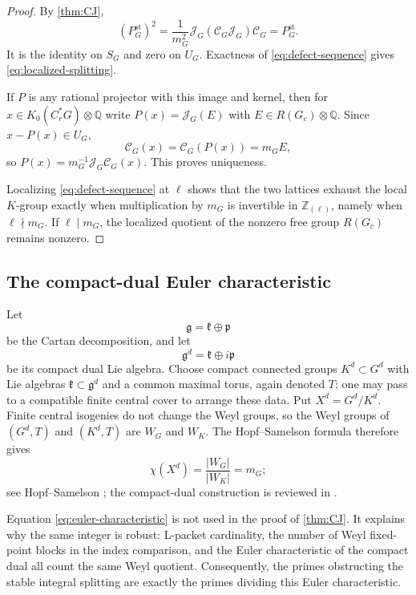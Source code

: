 \documentclass[11pt]{amsart}
\theoremstyle{definition}
\theoremstyle{remark}
\newcommand{\Z}{\mathbb Z}
\newcommand{\Q}{\mathbb Q}
\newcommand{\Cr}{C_r^*}
\newcommand{\st}{\mathrm{st}}
\begin{document}
\begin{proof}
By \cref{thm:CJ},
\[
  (P_G^{\st})^2
  =\frac1{m_G^2}\mathcal J_G
    (\mathcal C_G\mathcal J_G)\mathcal C_G
  =P_G^{\st}.
\]
It is the identity on $S_G$ and zero on $U_G$.  Exactness of \eqref{eq:defect-sequence} gives \eqref{eq:localized-splitting}.

If $P$ is any rational projector with this image and kernel, then for $x\in K_0(\Cr G)\otimes\Q$ write $P(x)=\mathcal J_G(E)$ with $E\in R(G_c)\otimes\Q$.  Since $x-P(x)\in U_G$,
\[
  \mathcal C_G(x)=\mathcal C_G(P(x))=m_GE,
\]
so $P(x)=m_G^{-1}\mathcal J_G\mathcal C_G(x)$.  This proves uniqueness.

Localizing \eqref{eq:defect-sequence} at $\ell$ shows that the two lattices exhaust the local $K$-group exactly when multiplication by $m_G$ is invertible in $\Z_{(\ell)}$, namely when $\ell\nmid m_G$.  If $\ell\mid m_G$, the localized quotient of the nonzero free group $R(G_c)$ remains nonzero.
\end{proof}

\subsection{The compact-dual Euler characteristic}

Let
\[
  \mathfrak g=\mathfrak k\oplus\mathfrak p
\]
be the Cartan decomposition, and let
\[
  \mathfrak g^d=\mathfrak k\oplus i\mathfrak p
\]
be its compact dual Lie algebra.  Choose compact connected groups $K^d\subset G^d$ with Lie algebras $\mathfrak k\subset\mathfrak g^d$ and a common maximal torus, again denoted $T$; one may pass to a compatible finite central cover to arrange these data.  Put $X^d=G^d/K^d$.  Finite central isogenies do not change the Weyl groups, so the Weyl groups of $(G^d,T)$ and $(K^d,T)$ are $W_G$ and $W_K$.  The Hopf--Samelson formula therefore gives
\begin{equation}\label{eq:euler-characteristic}
  \chi(X^d)=\frac{|W_G|}{|W_K|}=m_G;
\end{equation}
see Hopf--Samelson \cite{HopfSamelson1940}; the compact-dual construction is reviewed in \cite[Chapters~V and~X]{Helgason2001}.

Equation \eqref{eq:euler-characteristic} is not used in the proof of \cref{thm:CJ}.  It explains why the same integer is robust: L-packet cardinality, the number of Weyl fixed-point blocks in the index comparison, and the Euler characteristic of the compact dual all count the same Weyl quotient.  Consequently, the primes obstructing the stable integral splitting are exactly the primes dividing this Euler characteristic.
\end{document}
